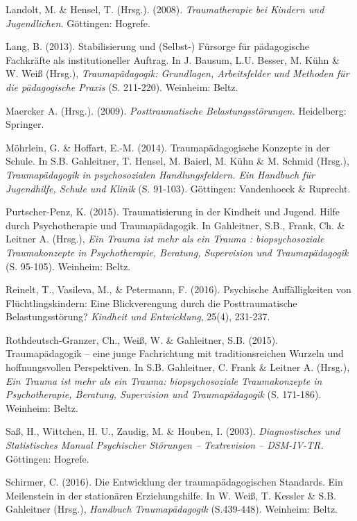 \hang
Landolt, M. \& Hensel, T. (Hrsg.). (2008). \textit{Traumatherapie bei Kindern und Jugendlichen.} Göttingen: Hogrefe.

\hang
Lang, B. (2013). Stabilisierung und (Selbst-) F{\"u}rsorge f{\"u}r p{\"a}dagogische Fachkr{\"a}fte als institutioneller Auftrag. In J. Bausum, L.U. Besser, M. Kühn \& W. Weiß (Hrsg.), \textit{Traumapädagogik: Grundlagen, Arbeitsfelder und Methoden für die pädagogische Praxis} (S. 211-220). Weinheim: Beltz.

\hang
Maercker A. (Hrsg.). (2009). \textit{Posttraumatische Belastungsst{\"o}rungen.} Heidelberg: Springer.

\hang
M{\"o}hrlein, G. \& Hoffart, E.-M. (2014). Traumap{\"a}dagogische Konzepte in der Schule. In S.B. Gahleitner, T. Hensel, M. Baierl, M. K{\"u}hn \& M. Schmid (Hrsg.), \textit{Traumap{\"a}dagogik in psychosozialen Handlungsfeldern. Ein Handbuch f{\"u}r Jugendhilfe, Schule und Klinik} (S. 91-103). Göttingen: Vandenhoeck \& Ruprecht.

\hang
Purtscher-Penz, K. (2015). Traumatisierung in der Kindheit und Jugend. Hilfe durch Psychotherapie und Traumap{\"a}dagogik. In Gahleitner, S.B., Frank, Ch. \& Leitner A. (Hrsg.), \textit{Ein Trauma ist mehr als ein Trauma : biopsychosoziale Traumakonzepte in Psychotherapie, Beratung, Supervision und Traumap{\"a}dagogik} (S. 95-105). Weinheim: Beltz.

\hang
Reinelt, T., Vasileva, M., \& Petermann, F. (2016). Psychische Auff{\"a}lligkeiten von Fl{\"u}chtlingskindern: Eine Blickverengung durch die Posttraumatische Belastungsst{\"o}rung? \textit{Kindheit und Entwicklung}, 25(4), 231-237.

\hang
Rothdeutsch-Granzer, Ch., Weiß, W. \& Gahleitner, S.B. (2015). Traumap{\"a}dagogik – eine junge Fachrichtung mit traditionsreichen Wurzeln und hoffnungsvollen Perspektiven. In S.B. Gahleitner, C. Frank \& Leitner A. (Hrsg.), \textit{Ein Trauma ist mehr als ein Trauma: biopsychosoziale Traumakonzepte in Psychotherapie, Beratung, Supervision und Traumap{\"a}dagogik} (S. 171-186). Weinheim: Beltz.

\hang
Saß, H., Wittchen, H. U., Zaudig, M. \& Houben, I. (2003). \textit{Diagnostisches und Statistisches Manual Psychischer Störungen – Textrevision – DSM-IV-TR.} Göttingen: Hogrefe.

\hang
Schirmer, C. (2016). Die Entwicklung der traumapädagogischen Standards. Ein Meilenstein in der stationären Erziehungshilfe. In W. Weiß, T. Kessler \& S.B. Gahleitner (Hrsg.), \textit{Handbuch Traumapädagogik} (S.439-448). Weinheim: Beltz.

